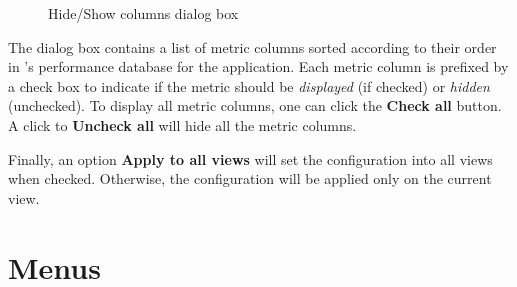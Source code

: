 \begin{itemize}
\begin{figure}[t]
\caption{Hide/Show columns dialog box}
\label{fig:hpcviewer-hide-show-columns}
\end{figure}

The dialog box contains a list of metric columns sorted according to their order in \HPCToolkit{}'s performance database for the application.
Each metric column is prefixed by a check box to indicate if the metric should be \textit{displayed} (if checked) or \textit{hidden} (unchecked).
To display all metric columns, one can click the \textbf{Check all} button.
A click to \textbf{Uncheck all} will hide all the metric columns.

Finally, an option \textbf{Apply to all views} will set the configuration into all views when checked.
Otherwise, the configuration will be applied only on the current view.

\end{itemize}



\section{Menus}

